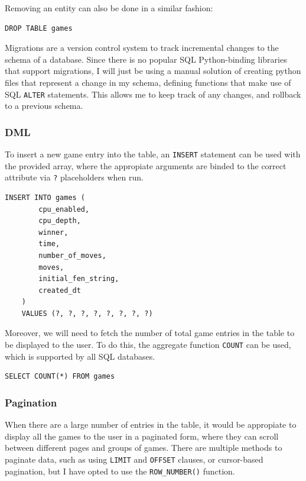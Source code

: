 \documentclass[../main/main.tex]{subfiles}
\begin{document}
\noindent Removing an entity can also be done in a similar fashion:

\begin{lstlisting}[language=sqlite, frame=lines]
    DROP TABLE games
\end{lstlisting}

Migrations are a version control system to track incremental changes to the schema of a database. Since there is no popular SQL Python-binding libraries that support migrations, I will just be using a manual solution of creating python files that represent a change in my schema, defining functions that make use of SQL \lstinline[language=sqlite]{ALTER} statements. This allows me to keep track of any changes, and rollback to a previous schema.

\subsubsection*{DML}
\label{sec:design-dml}
To insert a new game entry into the table, an \lstinline[language=sqlite]{INSERT} statement can be used with the provided array, where the appropiate arguments are binded to the correct attribute via \lstinline[language=Python]{?} placeholders when run.

\begin{lstlisting}[language=sqlite, frame=lines]
    INSERT INTO games (
        cpu_enabled,
        cpu_depth,
        winner,
        time,
        number_of_moves,
        moves,
        initial_fen_string,
        created_dt
    )
    VALUES (?, ?, ?, ?, ?, ?, ?, ?)
\end{lstlisting}

Moreover, we will need to fetch the number of total game entries in the table to be displayed to the user. To do this, the aggregate function \lstinline[language=sqlite]{COUNT} can be used, which is supported by all SQL databases.

\begin{lstlisting}[language=sqlite, frame=lines]
    SELECT COUNT(*) FROM games
\end{lstlisting}

\subsubsection*{Pagination}
When there are a large number of entries in the table, it would be appropiate to display all the games to the user in a paginated form, where they can scroll between different pages and groups of games. There are multiple methods to paginate data, such as using \lstinline[language=sqlite]{LIMIT} and \lstinline[language=sqlite]{OFFSET} clauses, or cursor-based pagination, but I have opted to use the \lstinline[language=sqlite]{ROW_NUMBER()} function.
\end{document}
